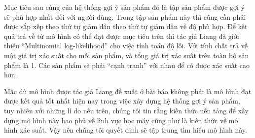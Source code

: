 Mục tiêu sau cùng của hệ thống gợi ý sản phẩm đó là tập sản phẩm được gợi ý sẽ phù hợp nhất đối với người dùng. 
Trong tập sản phẩm này thì cũng cần phải được sắp xếp theo thứ tự giảm dần theo thứ tự giảm dần về độ phù hợp.
Để kết quả trả về từ mô hình có thể đạt được mục tiêu trên thì tác giả Liang đã giới thiệu ``Multinomial log-likelihood'' cho việc tính toán độ lỗi. 
Với tính chất trả về một giá trị xác suất cho mỗi sản phẩm, và tổng giá trị xác suất trên toàn bộ sản phẩm là 1. 
Các sản phẩm sẽ phải ``cạnh tranh'' với nhau để có được xác suất cao hơn. 

Mặc dù mô hình được tác giả Liang đề xuất ở bài báo \cite{mvae} không phải là mô hình đạt được kết quả tốt nhất hiện nay trong việc xây dựng hệ thống gợi ý sản phẩm, tuy nhiên với những lí do nêu trên, chúng tôi tin rằng kiến thức nền tảng để xây dựng mô hình này bao phủ về lĩnh vực học máy cũng như là kiến thức về mô hình xác suất. Vậy nên chúng tôi quyết định sẽ tập trung tìm hiểu mô hình này. 



